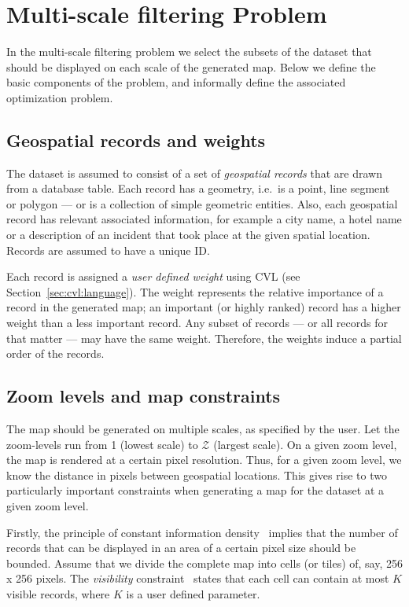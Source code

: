 \section{Multi-scale filtering Problem}
\label{sec:background}

In the multi-scale filtering problem we select the subsets of the dataset that should be displayed on each scale of the generated map. Below we define the basic components of the problem, and informally define the associated optimization problem. 

\subsection{Geospatial records and weights}
\label{sec:records}

The dataset is assumed to consist of a set of \emph{geospatial records} that are drawn from a database table. Each record has a geometry, i.e.\ is a point, line segment or polygon --- or is a collection of simple geometric entities. Also, each geospatial record has relevant associated information, for example a city name, a hotel name or a description of an incident that took place at the given spatial location. Records are assumed to have a unique ID.

Each record is assigned a \emph{user defined weight} using CVL (see Section~\ref{sec:cvl:language}). The weight represents the relative importance of a record in the generated map; an important (or highly ranked) record has a higher weight than a less important record. Any subset of records --- or all records for that matter --- may have the same weight. Therefore, the weights induce a partial order of the records.

\subsection{Zoom levels and map constraints}
\label{sec:zoomlevels}

The map should be generated on multiple scales, as specified by the user. Let the zoom-levels run from 1 (lowest scale) to $\mathcal{Z}$ (largest scale). On a given zoom level, the map is rendered at a certain pixel resolution. Thus, for a given zoom level, we know the distance in pixels between geospatial locations. This gives rise to two particularly important constraints when generating a map for the dataset at a given zoom level.

Firstly, the principle of constant information density~\cite{topfer1966principles} implies that the number of records that can be displayed in an area of a certain pixel size should be bounded. Assume that we divide the complete map into cells (or tiles) of, say, 256 x 256 pixels. The \emph{visibility} constraint~\cite{sarma2012fusiontables} states that each cell can contain at most $K$ visible records, where $K$ is a user defined parameter.

